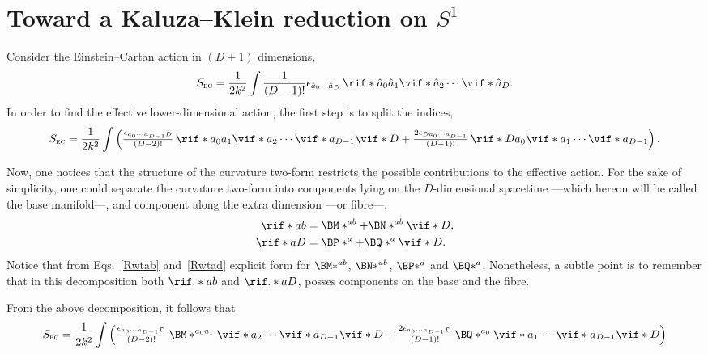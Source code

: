 \section[Toward a Kaluza--Klein reduction on S1]{Toward a Kaluza--Klein reduction on $S^1$}

Consider the Einstein--Cartan action in $(D+1)$ dimensions,
\begin{equation}
  S_{\text{\textsc{ec}}} = \frac{1}{2 k^2} \int \frac{1}{(D-1)!} \epsilon_{ \hat{a}_0 \cdots \hat{a}_{D} } \, \rif*{\hat{a}_0 \hat{a}_1}{} \vif*{\hat{a}_2} \cdots \vif*{\hat{a}_D}.
\end{equation}
In order to find the effective lower-dimensional action, the first step is to split the indices,
\begin{equation}
  S_{\text{\textsc{ec}}} = \frac{1}{2 k^2} \int \left( \tfrac{\epsilon_{ {a}_0 \cdots {a}_{D-1} D }}{(D-2)!}  \, \rif*{{a}_0 {a}_1}{} \vif*{{a}_2} \cdots \vif*{{a}_{D-1}} \vif*{D} + \tfrac{2 \epsilon_{ D {a}_0 \cdots {a}_{D-1} }}{(D-1)!}  \, \rif*{D {a}_0}{} \vif*{{a}_1} \cdots \vif*{{a}_{D-1}} \right).
\end{equation}

Now, one notices that the structure of the curvature two-form restricts the possible contributions to the effective action. For the sake of simplicity, one could separate the curvature two-form into components lying on the $D$-dimensional spacetime ---which hereon will be called the base manifold---, and component along the extra dimension ---or fibre---,
\begin{align}
  \rif*{a b}{} &= \BM*^{ab} + \BN*^{ab} \vif*{D}, \\
  \rif*{a D}{} &= \BP*^{a} + \BQ*^{a} \vif*{D}.
\end{align}
Notice that from Eqs.~\eqref{Rwtab} and~\eqref{Rwtad} explicit form for $\BM*^{ab}$, $\BN*^{ab}$, $\BP*^a$ and $\BQ*^a$. Nonetheless, a subtle point is to remember that in this decomposition both $\rif.*{a b}{}$ and $\rif.*{a D}{}$, posses components on the base and the fibre.

From the above decomposition, it follows that
\begin{align}
  S_{\text{\textsc{ec}}} = \frac{1}{2 k^2} \int \left( \tfrac{\epsilon_{ {a}_0 \cdots {a}_{D-1} D }}{(D-2)!}  \, \BM*^{ a_0 a_1} \vif*{a_2} \cdots \vif*{a_{D-1}} \vif*{D} + \tfrac{2 \epsilon_{ {a}_0 \cdots {a}_{D-1} D }}{(D-1)!}  \, \BQ*^{a_0} \vif*{{a}_1} \cdots \vif*{{a}_{D-1}} \vif*{D} \right)
\end{align}


\nocite{German:1993bq,Aros:2007nn}
\nocite{MuellerHoissen:1989yv,Mardones:1990qc}
